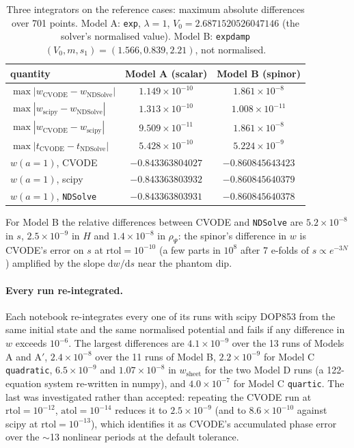 \documentclass[11pt,a4paper]{article}
\newcommand{\dd}{\mathrm{d}}
\begin{document}
\begin{table}[htbp]
\centering\small
\caption{Three integrators on the reference cases: maximum absolute differences over 701 points.
Model A: \texttt{exp}, $\lambda=1$, $V_0=2.6871520526047146$ (the solver's normalised value).
Model B: \texttt{expdamp} $(V_0,m,s_1)=(1.566,0.839,2.21)$, not normalised.}
\label{tab:threeway}
\begin{tabular}{@{}l c c@{}}
\toprule
quantity & Model A (scalar) & Model B (spinor) \\
\midrule
$\max|w_{\mathrm{CVODE}}-w_{\mathrm{NDSolve}}|$ & $1.149\times10^{-10}$ & $1.861\times10^{-8}$ \\
$\max|w_{\mathrm{scipy}}-w_{\mathrm{NDSolve}}|$ & $1.313\times10^{-10}$ & $1.008\times10^{-11}$ \\
$\max|w_{\mathrm{CVODE}}-w_{\mathrm{scipy}}|$ & $9.509\times10^{-11}$ & $1.861\times10^{-8}$ \\
$\max|t_{\mathrm{CVODE}}-t_{\mathrm{NDSolve}}|$ & $5.428\times10^{-10}$ & $5.224\times10^{-9}$ \\
$w(a=1)$, CVODE & $-0.843363804027$ & $-0.860845643423$ \\
$w(a=1)$, scipy & $-0.843363803932$ & $-0.860845640379$ \\
$w(a=1)$, \texttt{NDSolve} & $-0.843363803931$ & $-0.860845640378$ \\
\bottomrule
\end{tabular}
\end{table}

For Model B the relative differences between CVODE and \texttt{NDSolve} are $5.2\times10^{-8}$ in
$s$, $2.5\times10^{-9}$ in $H$ and $1.4\times10^{-8}$ in $\rho_\Psi$: the spinor's difference in
$w$ is CVODE's error on $s$ at $\mathrm{rtol}=10^{-10}$ (a few parts in $10^8$ after 7 e-folds of
$s\propto e^{-3N}$) amplified by the slope $\dd w/\dd s$ near the phantom dip.

\paragraph{Every run re-integrated.} Each notebook re-integrates every one of its runs with scipy
DOP853 from the same initial state and the same normalised potential and fails if any difference
in $w$ exceeds $10^{-6}$. The largest differences are $4.1\times10^{-9}$ over the 13 runs of
Models A and A$'$, $2.4\times10^{-8}$ over the 11 runs of Model B, $2.2\times10^{-9}$ for Model C
\texttt{quadratic}, $6.5\times10^{-9}$ and $1.07\times10^{-8}$ in $w_{\mathrm{sheet}}$ for the two
Model D runs (a 122-equation system re-written in numpy), and $4.0\times10^{-7}$ for Model C
\texttt{quartic}. The last was investigated rather than accepted: repeating the CVODE run at
$\mathrm{rtol}=10^{-12}$, $\mathrm{atol}=10^{-14}$ reduces it to $2.5\times10^{-9}$ (and to
$8.6\times10^{-10}$ against scipy at $\mathrm{rtol}=10^{-13}$), which identifies it as CVODE's
accumulated phase error over the $\sim$13 nonlinear periods at the default tolerance.
\end{document}
